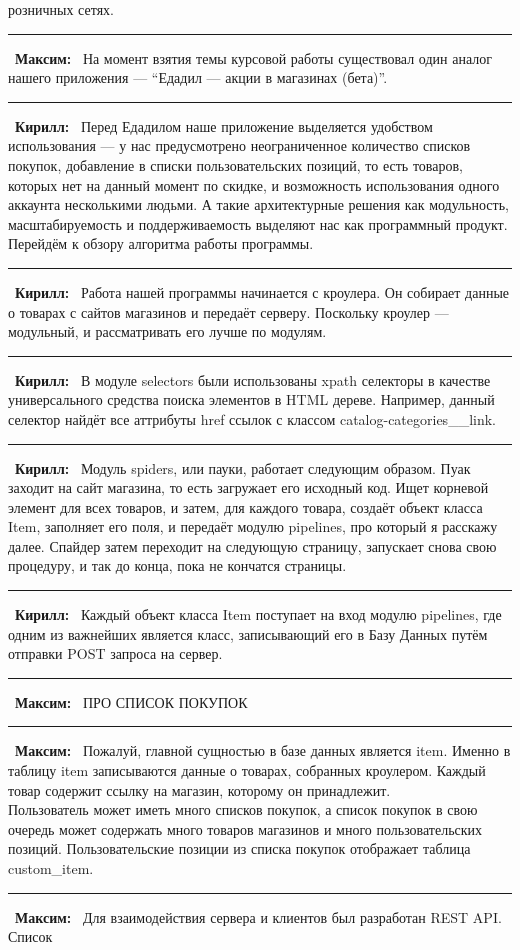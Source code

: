 \documentclass[12pt]{article}
\newcommand{\kir}{\textbf{Кирилл: }}
\renewcommand{\max}{\textbf{Максим: }}
\renewcommand{\line}{\noindent\rule{\textwidth}{1pt}}
\begin{document}
розничных сетях.
\line\
\max\ На момент взятия темы курсовой работы существовал один аналог нашего
приложения --- ``Едадил --- акции в магазинах (бета)''.\\
\line\
\kir\ Перед Едадилом наше приложение выделяется удобством использования --- у
нас предусмотрено неограниченное количество списков покупок, добавление в
списки пользовательских позиций, то есть товаров, которых нет на данный момент
по скидке, и возможность использования одного аккаунта несколькими людьми.  А
такие архитектурные решения как модульность, масштабируемость и
поддерживаемость выделяют нас как программный продукт. Перейдём к обзору
алгоритма работы программы.\\
\line\
\kir\ Работа нашей программы начинается с кроулера. Он собирает данные о товарах с
сайтов магазинов и передаёт серверу. Поскольку кроулер --- модульный, и
рассматривать его лучше по модулям.\\
\line\
\kir\ В модуле selectors были использованы xpath селекторы в качестве
универсального средства поиска элементов в HTML дереве. Например, данный
селектор найдёт все аттрибуты href ссылок с классом {\scriptsize
catalog-categories\_\_link}.\\
\line\
\kir\ Модуль spiders, или пауки, работает следующим образом. Пуак заходит на
сайт магазина, то есть загружает его исходный код. Ищет корневой элемент для
всех товаров, и затем, для каждого товара, создаёт объект класса Item,
заполняет его поля, и передаёт модулю pipelines, про который я расскажу далее.
Спайдер затем переходит на следующую страницу, запускает снова свою процедуру,
и так до конца, пока не кончатся страницы.\\
\line\
\kir\ Каждый объект класса Item поступает на вход модулю pipelines, где одним из
важнейших является класс, записывающий его в Базу Данных путём отправки
POST запроса на сервер.\\
\line\
\max\ ПРО СПИСОК ПОКУПОК\\
\line\
\max\ Пожалуй, главной сущностью в базе данных является item. Именно в таблицу item
записываются данные о товарах, собранных кроулером. Каждый товар содержит
ссылку на магазин, которому он принадлежит.\\
Пользователь может иметь много списков покупок, а список покупок в свою очередь
может содержать много товаров магазинов и много пользовательских позиций. 
Пользовательские позиции из списка покупок отображает таблица custom\_item.\\
\line\
\max\ Для взаимодействия сервера и клиентов был разработан REST API.\\ Список
\end{document}
